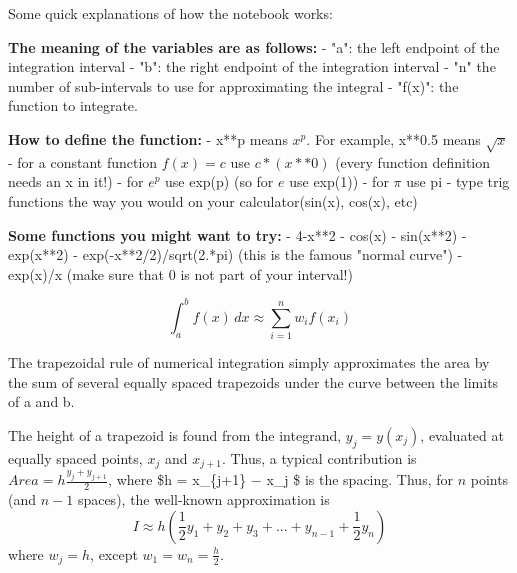 \documentclass[11pt]{article}
\begin{document}
    
    Some quick explanations of how the notebook works:

\textbf{The meaning of the variables are as follows:} - "a": the left
endpoint of the integration interval - "b": the right endpoint of the
integration interval - "n" the number of sub-intervals to use for
approximating the integral - "f(x)": the function to integrate.

\textbf{How to define the function:} - x**p means \(x^p\). For example,
x**0.5 means \(\sqrt x\) - for a constant function \(f(x) = c\) use
\(c*(x**0)\) (every function definition needs an x in it!) - for \(e^p\)
use exp(p) (so for \(e\) use exp(1)) - for \(\pi\) use pi - type trig
functions the way you would on your calculator(sin(x), cos(x), etc)

\textbf{Some functions you might want to try:} - 4-x**2 - cos(x) -
sin(x**2) - exp(x**2) - exp(-x**2/2)/sqrt(2.*pi) (this is the famous
"normal curve") - exp(x)/x (make sure that 0 is not part of your
interval!)

    \[     \int_{a}^b f(x)\,dx \approx \sum_{i=1}^n w_i f(x_i)\]

The trapezoidal rule of numerical integration simply approximates the
area by the sum of several equally spaced trapezoids under the curve
between the limits of a and b.

The height of a trapezoid is found from the integrand,
\(y_j = y ( x_j )\), evaluated at equally spaced points, \(x_j\) and
\(x_{j+1}\). Thus, a typical contribution is
\(Area = h\frac{ y_j + y_{j+1}}{2}\), where \$h = x\_\{j+1\} − x\_j \$
is the spacing. Thus, for \(n\) points (and \(n − 1\) spaces), the
well-known approximation is
\[ I \approx h \left( \frac{1}{2} y_1+y_2+y_3+ ...+y_{n-1}+ \frac{1}{2} y_n \right)\]
where \(w_j = h\), except \(w_1 = w_n = \frac{h}{2}\).
\end{document}
